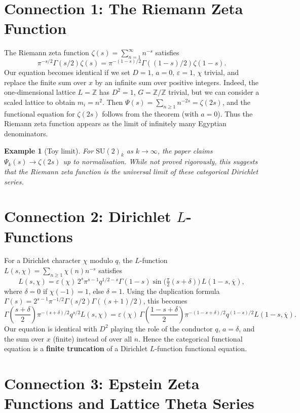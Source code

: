 \documentclass[12pt,a4paper]{article}
\newtheorem{example}[theorem]{Example}
\theoremstyle{remark}
\begin{document}
\section{Connection 1: The Riemann Zeta Function}

The Riemann zeta function $\zeta(s)=\sum_{n=1}^\infty n^{-s}$ satisfies
\[
\pi^{-s/2}\Gamma(s/2)\zeta(s)=\pi^{-(1-s)/2}\Gamma((1-s)/2)\zeta(1-s).
\]
Our equation becomes identical if we set $D=1$, $a=0$, $\varepsilon=1$, $\chi$ trivial, and replace the finite sum over $x$ by an infinite sum over positive integers. Indeed, the one‑dimensional lattice $L=\mathbb{Z}$ has $D^2=1$, $G=\mathbb{Z}/\mathbb{Z}$ trivial, but we can consider a scaled lattice to obtain $m_i = n^2$. Then $\Psi(s)=\sum_{n\ge1}n^{-2s}= \zeta(2s)$, and the functional equation for $\zeta(2s)$ follows from the theorem (with $a=0$). Thus the Riemann zeta function appears as the limit of infinitely many Egyptian denominators.

\begin{example}[Toy limit]
  For $\mathrm{SU}(2)_k$ as $k\to\infty$, the paper claims $\Psi_k(s) \to \zeta(2s)$ up to normalisation. While not proved rigorously, this suggests that the Riemann zeta function is the universal limit of these categorical Dirichlet series.
\end{example}

\section{Connection 2: Dirichlet $L$-Functions}

For a Dirichlet character $\chi$ modulo $q$, the $L$-function $L(s,\chi)=\sum_{n\ge1}\chi(n)n^{-s}$ satisfies
\[
L(s,\chi)=\varepsilon(\chi)\,2^{s}\pi^{s-1}q^{1/2-s}\Gamma(1-s)\sin\!\bigl(\tfrac{\pi}{2}(s+\delta)\bigr)\,L(1-s,\overline{\chi}),
\]
where $\delta=0$ if $\chi(-1)=1$, else $\delta=1$. Using the duplication formula $\Gamma(s)=2^{s-1}\pi^{-1/2}\Gamma(s/2)\Gamma((s+1)/2)$, this becomes
\[
\Gamma\!\left(\frac{s+\delta}{2}\right)\pi^{-(s+\delta)/2}q^{s/2}L(s,\chi)
= \varepsilon(\chi)\,\Gamma\!\left(\frac{1-s+\delta}{2}\right)\pi^{-(1-s+\delta)/2}q^{(1-s)/2}L(1-s,\overline{\chi}).
\]
Our equation is identical with $D^2$ playing the role of the conductor $q$, $a=\delta$, and the sum over $x$ (finite) instead of over all $n$. Hence the categorical functional equation is a \textbf{finite truncation} of a Dirichlet $L$-function functional equation.

\section{Connection 3: Epstein Zeta Functions and Lattice Theta Series}
\end{document}
